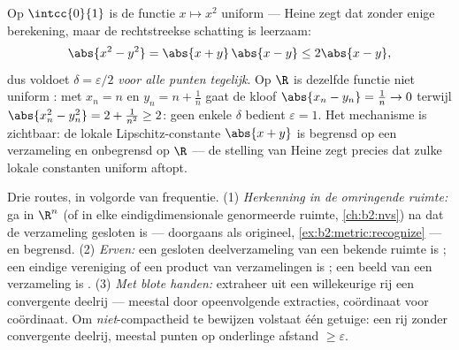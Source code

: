 \begin{example}\label{ex:b2:metric:heinework}
Op $\intcc{0}{1}$ is de functie $x \mapsto x^2$ uniform  ---
Heine zegt dat zonder enige berekening, maar de rechtstreekse
schatting is leerzaam:
\[
\abs{x^2 - y^2} = \abs{x + y}\,\abs{x - y} \leq 2\abs{x - y},
\]
dus voldoet $\delta = \varepsilon/2$ \emph{voor alle punten
tegelijk}. Op $\R$ is dezelfde functie niet uniform : met
$x_n = n$ en $y_n = n + \frac1n$ gaat de kloof $\abs{x_n - y_n} =
\frac1n \to 0$ terwijl $\abs{x_n^2 - y_n^2} = 2 + \frac1{n^2} \geq
2$: geen enkele $\delta$ bedient $\varepsilon = 1$. Het mechanisme
is zichtbaar: de lokale Lipschitz-constante $\abs{x + y}$ is
begrensd op een  verzameling en onbegrensd op $\R$ --- de
stelling van Heine zegt precies dat  zulke lokale
constanten uniform aftopt.
\end{example}

\begin{method}\label{met:b2:metric:compactness}
Drie routes, in volgorde van frequentie. (1) \emph{Herkenning in de
omringende ruimte:} ga in $\R^n$ (of in elke eindigdimensionale
genormeerde ruimte, \cref{ch:b2:nvs}) na dat de verzameling
gesloten is --- doorgaans als origineel,
\cref{ex:b2:metric:recognize} --- en begrensd. (2) \emph{Erven:}
een gesloten deelverzameling van een bekende  ruimte is
; een eindige vereniging of een product van 
verzamelingen is ; een  beeld van een 
verzameling is . (3) \emph{Met blote handen:} extraheer uit
een willekeurige rij een convergente deelrij --- meestal door
opeenvolgende extracties, coördinaat voor coördinaat. Om
\emph{niet}-compactheid te bewijzen volstaat één getuige: een rij
zonder convergente deelrij, meestal punten op onderlinge afstand
$\geq \varepsilon$.
\end{method}

